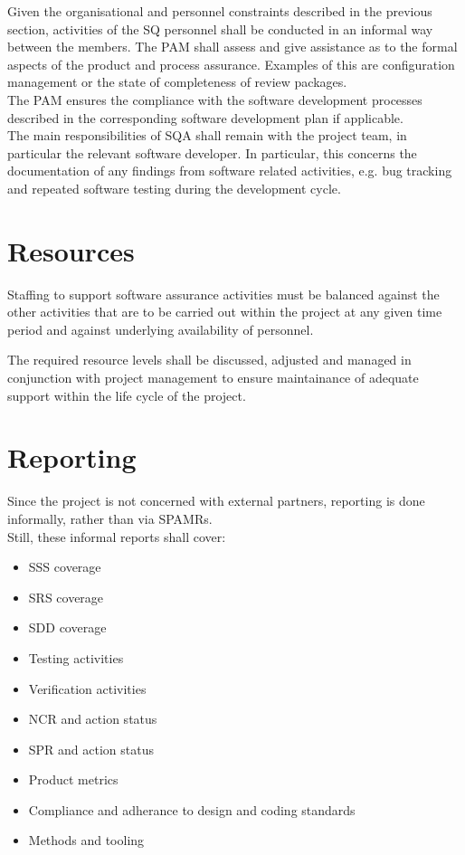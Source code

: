 \noindent
Given the organisational and personnel constraints described in the previous
section, activities of the \gls{SQ} personnel shall be conducted in an informal
way between the members. The \gls{PAM} shall assess and give assistance as to
the formal aspects of the product and process assurance. Examples of this
are configuration management or the state of completeness of review packages.\\

\noindent
The \gls{PAM} ensures the compliance with the software development processes
described in the corresponding software development plan if applicable.\\

\noindent
The main responsibilities of \gls{SQA} shall remain with the project team, in
particular the relevant software developer. In particular, this concerns
the documentation of any findings from software related activities, e.g. bug
tracking and repeated software testing during the development cycle.



\section{Resources}

Staffing to support software assurance activities must be balanced against the
other activities that are to be carried out within the project at any given time
period and against underlying availability of personnel.

The required resource levels shall be discussed, adjusted and managed in
conjunction with project management to ensure maintainance of adequate support
within the life cycle of the project.


\section{Reporting}

Since the project is not concerned with external partners, reporting is done
informally, rather than via \glspl{SPAMR}.\\

\noindent
Still, these informal reports shall cover:

\begin{itemize}
	\item \gls{SSS} coverage
	\item \gls{SRS} coverage
	\item \gls{SDD} coverage
	\item Testing activities
	\item Verification activities
	\item \gls{NCR} and action status
	\item \gls{SPR} and action status
	\item Product metrics
	\item Compliance and adherance to design and coding standards
	\item Methods and tooling
\end{itemize}

